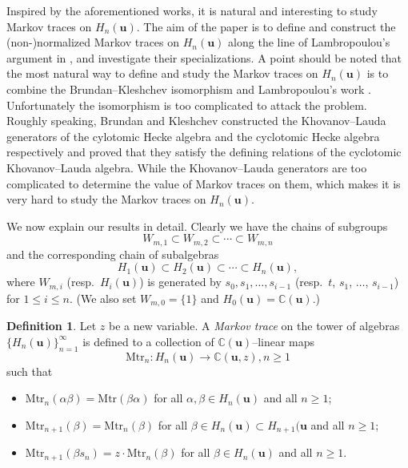 \documentclass[a4paper, oneside]{amsart}
\numberwithin{equation}{section}
\theoremstyle{definition}
\newtheorem{definition}[equation]{Definition}
\theoremstyle{remark}
\begin{document}
Inspired by the aforementioned works, it is natural and interesting to study Markov traces on  $H_n(\boldsymbol{u})$. The aim of the paper is to define and construct the (non-)normalized Markov traces on
$H_n(\boldsymbol{u})$ along the line of Lambropoulou's argument in \cite{L}, and investigate their specializations. A point should be noted that the most natural way to define and study the Markov traces on $H_n(\boldsymbol{u})$ is to combine the Brundan--Kleshchev isomorphism and Lambropoulou's  work \cite{L}. Unfortunately the isomorphism is too complicated to attack the problem. Roughly speaking, Brundan and Kleshchev constructed the Khovanov--Lauda generators of the cylotomic Hecke algebra and the cyclotomic Hecke algebra respectively and proved that they satisfy the defining relations of the cyclotomic Khovanov--Lauda algebra. While the Khovanov--Lauda generators are too complicated to determine the value of Markov traces on them, which makes it is very hard to study the Markov traces on $H_n(\boldsymbol{u})$.

We now explain our results in detail. Clearly we have the chains of subgroups
\begin{equation*}
 W_{m,1}\subset W_{m,2}\subset\cdots\subset W_{m,n}
\end{equation*}
 and the corresponding chain of subalgebras
  \begin{equation*}
  H_1(\boldsymbol{u})\subset H_2(\boldsymbol{u})\subset\cdots\subset H_n(\boldsymbol{u}),
\end{equation*}
 where $W_{m,i}$ (resp.~$H_i(\boldsymbol{u})$) is generated by $s_0, s_1, \ldots, s_{i-1}$ (resp.~$t$, $s_1$, $\ldots$, $s_{i-1}$) for $1\leq i\leq n$. (We also set $W_{m,0}=\{1\}$ and $H_0(\boldsymbol{u})=\mathbb{C}(\boldsymbol{u})$.)

\begin{definition}\label{Def:Markov-traces}
  Let $z$ be a new variable. A \textit{Markov trace} on the tower of algebras $\{H_n(\boldsymbol{u})\}_{n=1}^{\infty}$ is defined to a collection of $\mathbb{C}(\boldsymbol{u})$--linear maps
\begin{equation*}
  \mathrm{Mtr}_n: H_n(\boldsymbol{u})\rightarrow \mathbb{C}(\boldsymbol{u},z), n\geq 1
\end{equation*}
such that
\begin{itemize}
\item $\mathrm{Mtr}_n(\alpha\beta)=\mathrm{Mtr}(\beta\alpha)$ for all $\alpha,\beta\in H_n(\boldsymbol{u})$ and all $n\geq 1$;
\item $\mathrm{Mtr}_{n+1}(\beta)=\mathrm{Mtr}_n(\beta)$  for all $\beta\in H_{n}(\boldsymbol{u})\subset H_{n+1}(\boldsymbol{u}$ and all $n\geq 1$;
\item $\mathrm{Mtr}_{n+1}(\beta s_n)=z\cdot\mathrm{Mtr}_n(\beta)$ for all $\beta\in H_n(\boldsymbol{u})$ and all $n\geq 1$.
\end{itemize}
\end{definition}
\end{document}

